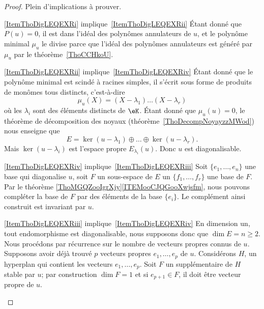 \begin{proof}
    Plein d'implications à prouver.
    \begin{subproof}
    \item[\ref{ItemThoDigLEQEXRi} implique~\ref{ItemThoDigLEQEXRii}] Étant donné que \( P(u)=0\), il est dans l'idéal des polynômes annulateurs de \( u\), et le polynôme minimal \( \mu_u\) le divise parce que l'idéal des polynômes annulateurs est généré par \( \mu_u\) par le théorème~\ref{ThoCCHkoU}.

    \item[\ref{ItemThoDigLEQEXRii} implique~\ref{ItemThoDigLEQEXRiv}] Étant donné que le polynôme minimal est scindé à racines simples, il s'écrit sous forme de produits de monômes tous distincts, c'est-à-dire
    \begin{equation}
        \mu_u(X)=(X-\lambda_1)\ldots(X-\lambda_r)
    \end{equation}
    où les \( \lambda_i\) sont des éléments distincts de \( \eK\). Étant donné que \( \mu_u(u)=0\), le théorème de décomposition des noyaux (théorème~\ref{ThoDecompNoyayzzMWod}) nous enseigne que
    \begin{equation}
        E=\ker(u-\lambda_1)\oplus\ldots\oplus\ker(u-\lambda_r).
    \end{equation}
    Mais \( \ker(u-\lambda_i)\) est l'espace propre \( E_{\lambda_i}(u)\). Donc \( u\) est diagonalisable.

\item[\ref{ItemThoDigLEQEXRiv} implique~\ref{ItemThoDigLEQEXRiii}] Soit \( \{ e_1,\ldots, e_n \}\) une base qui diagonalise \( u\), soit \( F\) un sous-espace de \( E\) un \( \{ f_1,\ldots, f_r \}\) une base de \( F\). Par le théorème \ref{ThoMGQZooIgrXjy}\ref{ITEMooCJQGooXwjsfm}, nous pouvons compléter la base de \( F\) par des éléments de la base \( \{ e_i \}\). Le complément ainsi construit est invariant par \( u\).

\item[\ref{ItemThoDigLEQEXRiii} implique~\ref{ItemThoDigLEQEXRiv}] En dimension un, tout endomorphisme est diagonalisable, nous supposons donc que \( \dim E=n\geq 2\). Nous procédons par récurrence sur le nombre de vecteurs propres connus de \( u\). Supposons avoir déjà trouvé \( p\) vecteurs propres \( e_1,\ldots, e_p\) de \( u\). Considérons \( H\), un hyperplan qui contient les vecteurs \( e_1,\ldots, e_p\). Soit \( F\) un supplémentaire de \( H\) stable par \( u\); par construction \( \dim F=1\) et si \( e_{p+1}\in F\), il doit être vecteur propre de \( u\).


\end{subproof}
\end{proof}
